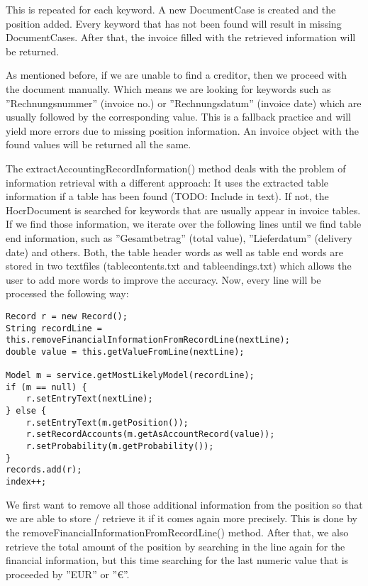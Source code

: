 This is repeated for each keyword. A new DocumentCase is created and the position added. Every keyword that has not been found will result in missing DocumentCases. After that, the invoice filled with the retrieved information will be returned.

As mentioned before, if we are unable to find a creditor, then we proceed with the document manually. Which means we are looking for keywords such as ''Rechnungsnummer'' (invoice no.) or ''Rechnungsdatum'' (invoice date) which are usually followed by the corresponding value. This is a fallback practice and will yield more errors due to missing position information. An invoice object with the found values will be returned all the same.

The extractAccountingRecordInformation() method deals with the problem of information retrieval with a different approach: It uses the extracted table information if a table has been found (TODO: Include in text). If not, the HocrDocument is searched for keywords that are usually appear in invoice tables. If we find those information, we iterate over the following lines until we find table end information, such as ''Gesamtbetrag'' (total value), ''Lieferdatum'' (delivery date) and others. Both, the table header words as well as table end words are stored in two textfiles (tablecontents.txt and tableendings.txt) which allows the user to add more words to improve the accuracy.
Now, every line will be processed the following way:

\begin{lstlisting}
Record r = new Record();
String recordLine = this.removeFinancialInformationFromRecordLine(nextLine);
double value = this.getValueFromLine(nextLine);

Model m = service.getMostLikelyModel(recordLine); 
if (m == null) {
    r.setEntryText(nextLine);
} else {
    r.setEntryText(m.getPosition());
    r.setRecordAccounts(m.getAsAccountRecord(value));
    r.setProbability(m.getProbability());
}
records.add(r);
index++;
\end{lstlisting}

We first want to remove all those additional information from the position so that we are able to store / retrieve it if it comes again more precisely. This is done by the removeFinancialInformationFromRecordLine() method. After that, we also retrieve the total amount of the position by searching in the line again for the financial information, but this time searching for the last numeric value that is proceeded by ''EUR'' or ''\euro''.

